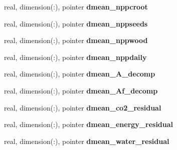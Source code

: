 \begin{DoxyCompactItemize}
\item 
\hypertarget{structed__state__vars_1_1edtype_ab0774dfc38cb8b0a2e7c72ab25620189}{
real, dimension(:), pointer {\bfseries dmean\_\-nppcroot}}
\label{structed__state__vars_1_1edtype_ab0774dfc38cb8b0a2e7c72ab25620189}

\item 
\hypertarget{structed__state__vars_1_1edtype_ad3c35a09cce69d99f73bcbc3574f872b}{
real, dimension(:), pointer {\bfseries dmean\_\-nppseeds}}
\label{structed__state__vars_1_1edtype_ad3c35a09cce69d99f73bcbc3574f872b}

\item 
\hypertarget{structed__state__vars_1_1edtype_ac0eb2a08f0f2bc15cc24ad5065dd4df2}{
real, dimension(:), pointer {\bfseries dmean\_\-nppwood}}
\label{structed__state__vars_1_1edtype_ac0eb2a08f0f2bc15cc24ad5065dd4df2}

\item 
\hypertarget{structed__state__vars_1_1edtype_a18a1e14d6481f94b067b57c61847c64b}{
real, dimension(:), pointer {\bfseries dmean\_\-nppdaily}}
\label{structed__state__vars_1_1edtype_a18a1e14d6481f94b067b57c61847c64b}

\item 
\hypertarget{structed__state__vars_1_1edtype_a73e9475501ae5d82d5f1254ba75c853f}{
real, dimension(:), pointer {\bfseries dmean\_\-A\_\-decomp}}
\label{structed__state__vars_1_1edtype_a73e9475501ae5d82d5f1254ba75c853f}

\item 
\hypertarget{structed__state__vars_1_1edtype_a6fd1c4ba426800149c2902208c9a9c78}{
real, dimension(:), pointer {\bfseries dmean\_\-Af\_\-decomp}}
\label{structed__state__vars_1_1edtype_a6fd1c4ba426800149c2902208c9a9c78}

\item 
\hypertarget{structed__state__vars_1_1edtype_ac5b56eb3cf615641cfecc8b7843769e3}{
real, dimension(:), pointer {\bfseries dmean\_\-co2\_\-residual}}
\label{structed__state__vars_1_1edtype_ac5b56eb3cf615641cfecc8b7843769e3}

\item 
\hypertarget{structed__state__vars_1_1edtype_a17af35a1784cc6c6ba387ab444a35532}{
real, dimension(:), pointer {\bfseries dmean\_\-energy\_\-residual}}
\label{structed__state__vars_1_1edtype_a17af35a1784cc6c6ba387ab444a35532}

\item 
\hypertarget{structed__state__vars_1_1edtype_a599704f3048d056a6ac6364d2284c447}{
real, dimension(:), pointer {\bfseries dmean\_\-water\_\-residual}}
\label{structed__state__vars_1_1edtype_a599704f3048d056a6ac6364d2284c447}


\end{DoxyCompactItemize}
